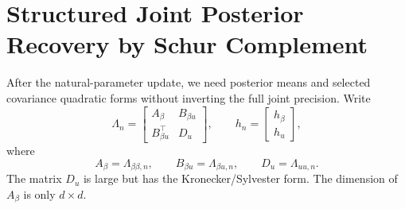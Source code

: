 \documentclass[12pt]{article}
\begin{document}
\section{Structured Joint Posterior Recovery by Schur Complement}
\label{sec:structured_joint_schur}

After the natural-parameter update, we need posterior means and selected covariance
quadratic forms without inverting the full joint precision. Write
\begin{equation}
    \Lambda_n=
    \begin{bmatrix}
        A_\beta & B_{\beta u}\\
        B_{\beta u}^\top & D_u
    \end{bmatrix},
    \qquad
    h_n=
    \begin{bmatrix}
        h_\beta\\h_u
    \end{bmatrix},
    \label{eq:schur_block_notation}
\end{equation}
where
\begin{equation}
    A_\beta=\Lambda_{\beta\beta,n},
    \qquad
    B_{\beta u}=\Lambda_{\beta u,n},
    \qquad
    D_u=\Lambda_{uu,n}.
\end{equation}
The matrix $D_u$ is large but has the Kronecker/Sylvester form. The dimension of
$A_\beta$ is only $d\times d$.
\end{document}
